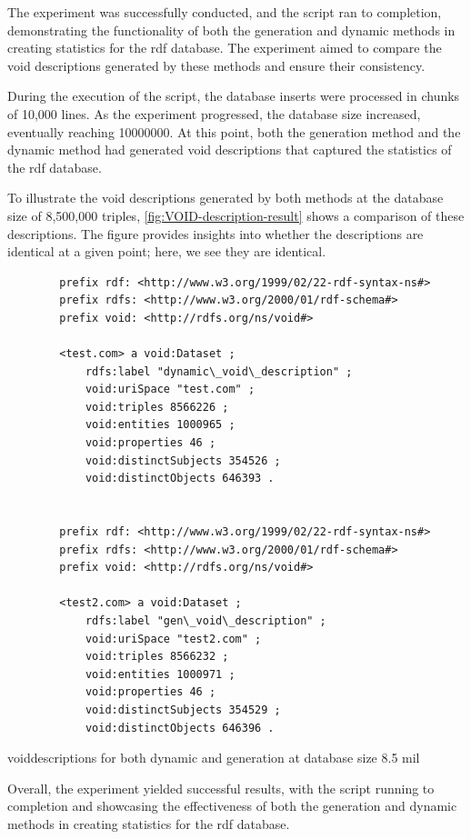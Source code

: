 The experiment was successfully conducted, and the script ran to completion, demonstrating the functionality of both the generation and dynamic methods in creating statistics for the  \gls{rdf} database. The experiment aimed to compare the \gls{void} descriptions generated by these methods and ensure their consistency.


During the execution of the script, the database inserts were processed in chunks of 10,000 lines. As the experiment progressed, the database size increased, eventually reaching 10000000. At this point, both the generation method and the dynamic method had generated \gls{void} descriptions that captured the statistics of the  \gls{rdf} database.


To illustrate the \gls{void} descriptions generated by both methods at the database size of 8,500,000 triples, \autoref*{fig:VOID-description-result} shows a comparison of these descriptions. The figure provides insights into whether the descriptions are identical at a given point; here, we see they are identical.


\begin{listing}[!ht]
    \begin{verbatim}
        prefix rdf: <http://www.w3.org/1999/02/22-rdf-syntax-ns#>
        prefix rdfs: <http://www.w3.org/2000/01/rdf-schema#>
        prefix void: <http://rdfs.org/ns/void#>
        
        <test.com> a void:Dataset ;
            rdfs:label "dynamic\_void\_description" ;
            void:uriSpace "test.com" ;
            void:triples 8566226 ;
            void:entities 1000965 ;
            void:properties 46 ;
            void:distinctSubjects 354526 ;
            void:distinctObjects 646393 .
        
        
        prefix rdf: <http://www.w3.org/1999/02/22-rdf-syntax-ns#>
        prefix rdfs: <http://www.w3.org/2000/01/rdf-schema#>
        prefix void: <http://rdfs.org/ns/void#>
        
        <test2.com> a void:Dataset ;
            rdfs:label "gen\_void\_description" ;
            void:uriSpace "test2.com" ;
            void:triples 8566232 ;
            void:entities 1000971 ;
            void:properties 46 ;
            void:distinctSubjects 354529 ;
            void:distinctObjects 646396 .
    \end{verbatim}
    \caption{voiddescriptions for both dynamic and generation at database size 8.5 mil}
    \label{fig:VOID-description-result}
\end{listing}
Overall, the experiment yielded successful results, with the script running to completion and showcasing the effectiveness of both the generation and dynamic methods in creating statistics for the  \gls{rdf} database. 










